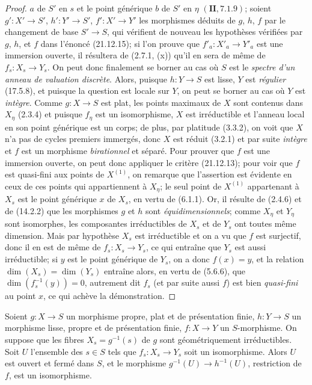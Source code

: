\begin{proof}
$a$ de $S'$ en $s$ et le point générique $b$ de $S'$ en $\eta$ $(\mathbf{II}, 7.1.9)$;
soient $g':X'\to S'$, $h':Y'\to S'$, $f':X'\to Y'$ les morphismes déduits de $g$,
$h$, $f$ par le changement de base $S'\to S$, qui vérifient de nouveau les hypothèses
vérifiées par $g$, $h$, et $f$ dans l'énoncé (21.12.15); si l'on prouve que
$f'_a:X'_a\to Y'_a$ est une immersion ouverte, il résultera de (2.7.1, (x)) qu'il en
sera de même de $f_s:X_s\to Y_s$. On peut donc finalement se borner au cas où $S$ est
le \emph{spectre d'un anneau de valuation discrète}.
Alors, puisque $h:Y\to S$ est lisse, $Y$ est \emph{régulier} (17.5.8), et puisque la question
est locale sur $Y$, on peut se borner au cas où $Y$ est \emph{intègre}. Comme $g:X\to S$ est
plat, les points maximaux de $X$ sont contenus dans $X_\eta$ (2.3.4) et puisque
$f_\eta$ est un isomorphisme, $X$ est irréductible et l'anneau local en son point
générique est un corps; de plus, par platitude (3.3.2), on voit que $X$ n'a pas de cycles
premiers immergés, donc $X$ est réduit (3.2.1) et par suite \emph{intègre} et $f$ est un
morphisme \emph{birationnel} et séparé. Pour prouver que $f$ est une immersion ouverte, on peut
donc appliquer le critère (21.12.13); pour voir que $f$ est quasi-fini aux points de
$X^{(1)}$, on remarque que l'assertion est évidente en ceux de ces points qui
appartiennent à $X_\eta$; le seul point de $X^{(1)}$ appartenant à $X_s$ est le point
générique $x$ de $X_s$, en vertu de (6.1.1). Or, il résulte de (2.4.6) et de (14.2.2)
que les morphismes $g$ et $h$ sont \emph{équidimensionnels}; comme $X_\eta$ et $Y_\eta$ sont
isomorphes, les composantes irréductibles de $X_s$ et de $Y_s$ ont toutes même
dimension. Mais par hypothèse $X_s$ est irréductible et on a vu que $f$ est surjectif,
donc il en est de même de $f_s:X_s\to Y_s$, ce qui entraîne que $Y_s$ est aussi
irréductible; si $y$ est le point générique de $Y_s$, on a donc $f(x)=y$, et la relation
$\dim(X_s)=\dim(Y_s)$ entraîne alors, en vertu de (5.6.6), que
$\dim(f_s^{-1}(y))=0$, autrement dit $f_s$ (et par suite aussi $f$) est bien \emph{quasi-fini}
au point $x$, ce qui achève la démonstration.
\end{proof}

\begin{corollary}[21.12.16]
\label{IV.21.12.16}
Soient $g:X\to S$ un morphisme propre, plat et de présentation finie, $h:Y\to S$ un
morphisme lisse, propre et de présentation finie, $f:X\to Y$ un $S$-morphisme. On
suppose que les fibres $X_s=g^{-1}(s)$ de $g$ sont géométriquement irréductibles. Soit
$U$ l'ensemble des $s\in S$ tels que $f_s:X_s\to Y_s$ soit un isomorphisme. Alors
$U$ est ouvert et fermé dans $S$, et le morphisme $g^{-1}(U)\to h^{-1}(U)$,
restriction de $f$, est un isomorphisme.
\end{corollary}

